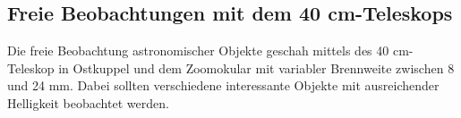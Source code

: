 \subsection{Freie Beobachtungen mit dem 40 cm-Teleskops}
Die freie Beobachtung astronomischer Objekte geschah mittels des 40 cm-Teleskop in Ostkuppel und dem Zoomokular mit variabler Brennweite zwischen 8 und 24 mm. Dabei sollten verschiedene interessante Objekte mit ausreichender Helligkeit beobachtet werden.  